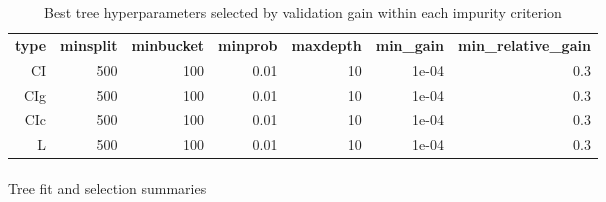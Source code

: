 \documentclass[
  11pt,
  a4paper,
]{article}
\makeatletter
\let\oldparagraph\paragraph
\renewcommand{\paragraph}{
    \@ifstar
      \xxxParagraphStar
      \xxxParagraphNoStar
  }
\newcommand{\xxxParagraphStar}[1]{\oldparagraph*{#1}\mbox{}}
\newcommand{\xxxParagraphNoStar}[1]{\oldparagraph{#1}\mbox{}}
\makeatother
\begin{document}
\begin{longtable}[t]{rrrrrrr}

\caption{\label{tbl-appendix-tree-best-controls}Best tree
hyperparameters selected by validation gain within each impurity
criterion}

\tabularnewline

\\
\toprule
\textbf{type} & \textbf{minsplit} & \textbf{minbucket} & \textbf{minprob} & \textbf{maxdepth} & \textbf{min\_gain} & \textbf{min\_relative\_gain}\\
\midrule
CI & 500 & 100 & 0.01 & 10 & 1e-04 & 0.3\\
CIg & 500 & 100 & 0.01 & 10 & 1e-04 & 0.3\\
CIc & 500 & 100 & 0.01 & 10 & 1e-04 & 0.3\\
L & 500 & 100 & 0.01 & 10 & 1e-04 & 0.3\\
\bottomrule

\end{longtable}

\endgroup{}

\paragraph{Tree fit and selection
summaries}\label{tree-fit-and-selection-summaries}

\begingroup\fontsize{11}{13}\selectfont
\end{document}
